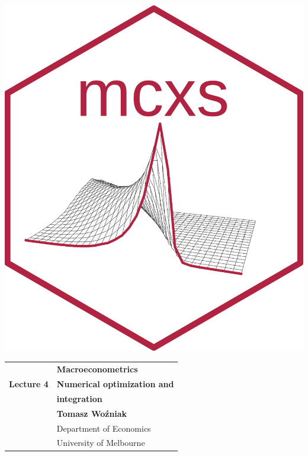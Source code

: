 \documentclass[notes,blackandwhite,mathsans]{beamer}
\begin{document}




\begin{frame}
\centering\includegraphics[scale=1.87]{mcxs.png}
\end{frame}





{
\begin{frame}

\vspace{1cm}
\begin{tabular}{rl}
&\textbf{\LARGE\color{mcxs1} Macroeconometrics}\\[8ex]
\textbf{\Large\color{mcxs5} Lecture 4}&\textbf{\Large\color{mcxs2}Numerical optimization and}\\
&\textbf{\Large\color{mcxs2}integration}\\[17ex]
&\textbf{\color{mcxs2}Tomasz Wo\'zniak}\\[1ex]
&{\small\color{mcxs5} Department of Economics}\\
&{\small\color{mcxs5}University of Melbourne}
\end{tabular}

\end{frame}
}
\end{document}
